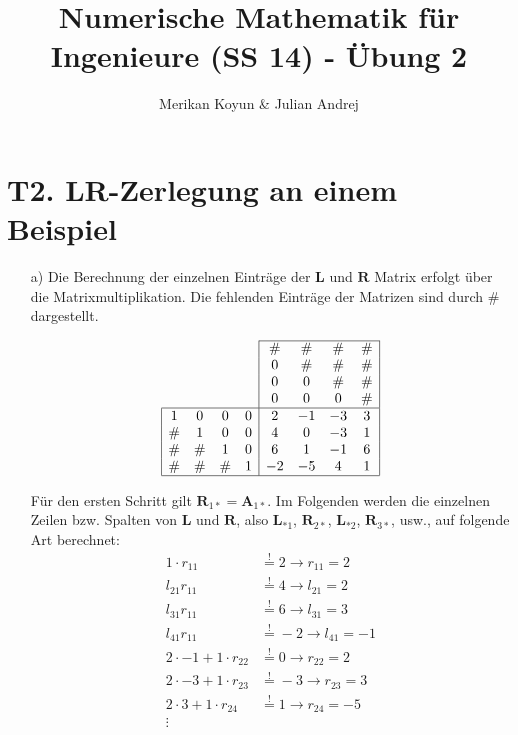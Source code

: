 \documentclass[11pt]{article}
\theoremstyle{plain}
\theoremstyle{definition}
\let\mbb\boldsymbol
\renewcommand\boldsymbol{\mbb}
\renewcommand{\a}{\"{a}}
\renewcommand{\u}{\"{u}}
\newcommand{\beequal}{\mathop{=}\limits^!}
\begin{document}
\title{Numerische Mathematik f\u r Ingenieure (SS 14) - \"{U}bung 2}
\author{Merikan Koyun \& Julian Andrej}
\maketitle

\section*{T2. LR-Zerlegung an einem Beispiel}
\begin{itemize}
\item[a)]
Die Berechnung der einzelnen Eintr\a ge der $\mbb{L}$ und $\mbb{R}$ Matrix erfolgt \u ber die Matrixmultiplikation. Die fehlenden Eintr\a ge der Matrizen sind durch \# dargestellt.

\begin{align*}
\begin{array}{cccc|cccc|}
\cline{5-8}
 &  &  &         & \#  & \# & \# & \#  \\
 &  &  &         & 0  &  \# &  \# & \#  \\ 
 &  &  &         & 0  &  0 &  \# &  \#  \\
 &  &  &         & 0  &  0 &  0 & \# \\ \hline
\multicolumn{1}{|c}  1 & 0 & 0 & 0     & 2  & -1 & -3 & 3 \\
\multicolumn{1}{|c}  \# & 1 & 0 & 0    & 4  & 0 & -3 & 1   \\
\multicolumn{1}{|c}  \# & \# & 1 & 0    & 6  & 1 & -1 & 6   \\
\multicolumn{1}{|c} \# & \# & \# & 1  & -2  & -5 & 4 & 1   \\ \hline
\end{array}
\end{align*}

F\u r den ersten Schritt gilt $\mbb{R}_{1*} = \mbb{A}_{1*}$. Im Folgenden werden die einzelnen Zeilen bzw. Spalten von $\mbb{L}$ und $\mbb{R}$, also $\mbb{L}_{*1}$, $\mbb{R}_{2*}$, $\mbb{L}_{*2}$, $\mbb{R}_{3*}$, usw., auf folgende Art berechnet:
\begin{align*}
1 \cdot r_{11}  &\beequal 2 \rightarrow r_{11}=2  \\ 
l_{21} r_{11}  &\beequal 4  \rightarrow l_{21}=2  \\
l_{31} r_{11}  &\beequal 6  \rightarrow l_{31}=3  \\
l_{41} r_{11}  &\beequal -2 \rightarrow l_{41}=-1 \\
2 \cdot -1 + 1 \cdot r_{22} &\beequal 0 \rightarrow r_{22} = 2 \\
2 \cdot -3 + 1 \cdot r_{23} &\beequal -3 \rightarrow r_{23} = 3 \\
2 \cdot 3  + 1 \cdot r_{24} &\beequal 1  \rightarrow r_{24} = -5\\
\vdots
\end{align*}


\end{itemize}
\end{document}
